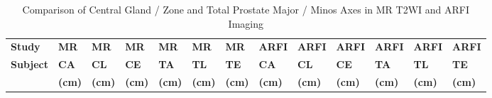 \begin{table}
\centering
\caption{Comparison of Central Gland / Zone and Total Prostate Major / Minos Axes in MR T2WI and ARFI Imaging}
\begin{tabular}{|l|l|l|l|l|l|l|l|l|l|l|l|l|} \hline
{\bf Study} & {\bf MR} & {\bf MR} & {\bf MR} & {\bf MR} & {\bf MR} & {\bf MR} & {\bf ARFI} & {\bf ARFI} & {\bf ARFI} & {\bf ARFI} & {\bf ARFI} & {\bf ARFI} \\ 
{\bf Subject} & {\bf CA} & {\bf CL} & {\bf CE} & {\bf TA} & {\bf TL} & {\bf TE} & {\bf CA} & {\bf CL} & {\bf CE} & {\bf TA} & {\bf TL} & {\bf TE} \\
 & {\bf (cm)} & {\bf (cm)} & {\bf (cm)} & {\bf (cm)} & {\bf (cm)} & {\bf (cm)} & {\bf (cm)} & {\bf (cm)} & {\bf (cm)} & {\bf (cm)} & {\bf (cm)} & {\bf (cm)} \\ \hline

\hline
\end{tabular}
\label{tab:mr_arfi_axes}
\end{table}
